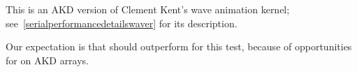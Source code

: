 This is an AKD version of Clement Kent's wave animation kernel;
see~\ref{serialperformancedetailswaver} for its description.

Our expectation is that \awlf should outperform \wlf for
this test, because of opportunities for \awlf on AKD
arrays.

